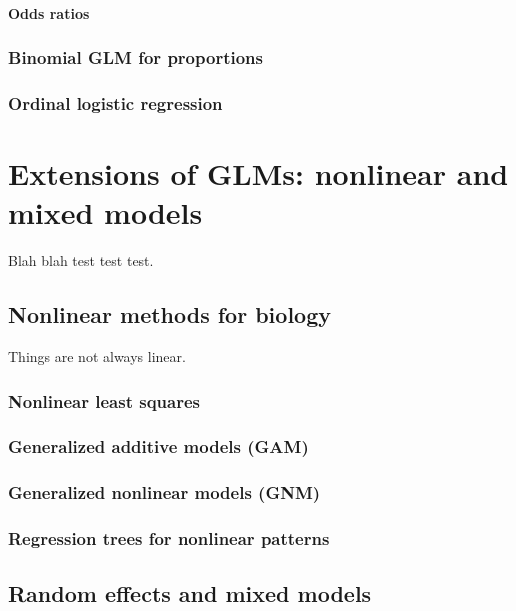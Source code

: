\documentclass[
  13,
  letterpaper,
]{report}
\begin{document}
\subsection{Odds ratios}\label{sec-glm4-logistics-or}

\section{Binomial GLM for proportions}\label{sec-glm4-binom}

\section{Ordinal logistic regression}\label{sec-glm4-ord}

\part{Extensions of GLMs: nonlinear and mixed models}

Blah blah test test test.

\chapter{Nonlinear methods for biology}\label{sec-non}

Things are not always linear.

\section{Nonlinear least squares}\label{sec-non-nls}

\section{Generalized additive models (GAM)}\label{sec-non-gam}

\section{Generalized nonlinear models (GNM)}\label{sec-non-gnm}

\section{Regression trees for nonlinear patterns}\label{sec-non-cart}

\chapter{Random effects and mixed models}\label{sec-mixed}
\end{document}
